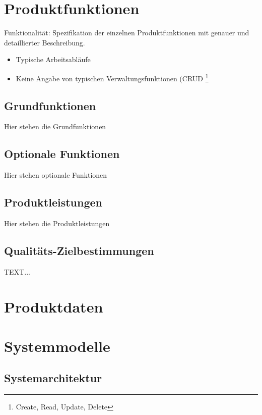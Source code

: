 \documentclass[a4paper]{scrreprt}
\begin{document}
\chapter{Produktfunktionen}
Funktionalität: Spezifikation der einzelnen Produktfunktionen mit genauer und detaillierter Beschreibung.

\begin{itemize}
  \item Typische Arbeitsabläufe
  \item Keine Angabe von typischen Verwaltungsfunktionen (CRUD \footnote{Create,
Read, Update, Delete}
\end{itemize}

\section{Grundfunktionen}
Hier stehen die Grundfunktionen

\section{Optionale Funktionen}
Hier stehen optionale Funktionen

\section{Produktleistungen}
Hier stehen die Produktleistungen

\section{Qualitäts-Zielbestimmungen}
TEXT...

\chapter{Produktdaten}

\chapter{Systemmodelle}
\section{Systemarchitektur}
\end{document}
